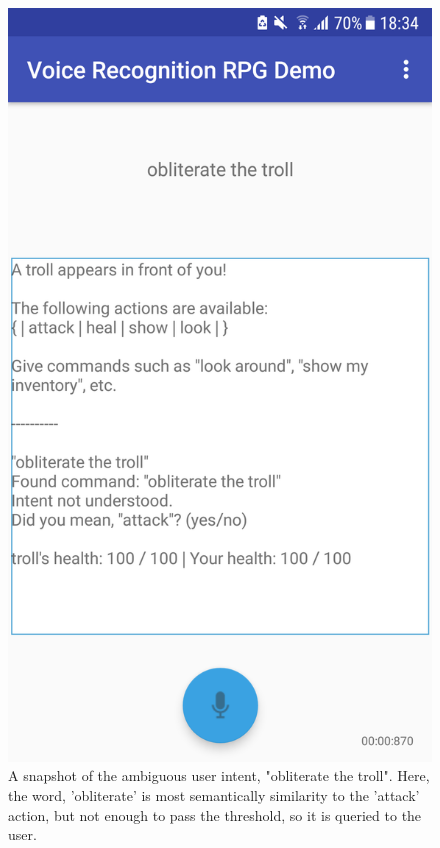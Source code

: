 \documentclass[12pt]{article}
\begin{document}
\begin{center}
\begin{figure}
\begin{center}
  \includegraphics[scale=0.25]{Screenshot_20180522-183411.png}
  \caption{A snapshot of the ambiguous user intent, "obliterate the troll". Here, the word, 'obliterate' is most semantically similarity to the 'attack' action, but not enough to pass the threshold, so it is queried to the user.}
  \label{fig:snapshot-suggestion}
  \end{center}
\end{figure}
\end{center}
\end{document}
